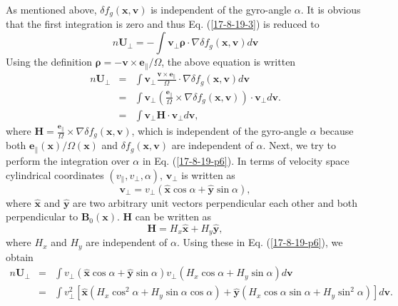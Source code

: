 \documentclass{article}
\newcommand{\tmmathbf}[1]{\ensuremath{\boldsymbol{#1}}}
\begin{document}
As mentioned above, $\delta f_g (\mathbf{x}, \mathbf{v})$ is independent of
the gyro-angle $\alpha$. It is obvious that the first integration is zero and
thus Eq. (\ref{17-8-19-3}) is reduced to
\begin{equation}
  n\mathbf{U}_{\perp} = - \int \mathbf{v}_{\perp} \tmmathbf{\rho} \cdot \nabla
  \delta f_g (\mathbf{x}, \mathbf{v}) d\mathbf{v}
\end{equation}
Using the definition $\tmmathbf{\rho}= -\mathbf{v} \times
\mathbf{e}_{\parallel} / \Omega$, the above equation is written
\begin{eqnarray}
  n\mathbf{U}_{\perp} & = & \int \mathbf{v}_{\perp} \frac{\mathbf{v} \times
  \mathbf{e}_{\parallel}}{\Omega} \cdot \nabla \delta f_g (\mathbf{x},
  \mathbf{v}) d\mathbf{v} \nonumber\\
  & = & \int \mathbf{v}_{\perp} \left( \frac{\mathbf{e}_{\parallel}}{\Omega}
  \times \nabla \delta f_g (\mathbf{x}, \mathbf{v}) \right) \cdot
  \mathbf{v}_{\perp} d\mathbf{v}. \nonumber\\
  & = & \int \mathbf{v}_{\perp} \mathbf{H} \cdot \mathbf{v}_{\perp}
  d\mathbf{v},  \label{17-8-19-p6}
\end{eqnarray}
where $\mathbf{H}= \frac{\mathbf{e}_{\parallel}}{\Omega} \times \nabla \delta
f_g (\mathbf{x}, \mathbf{v})$, which is independent of the gyro-angle $\alpha$
because both $\mathbf{e}_{\parallel} (\mathbf{x}) / \Omega (\mathbf{x})$ and
$\delta f_g (\mathbf{x}, \mathbf{v})$ are independent of $\alpha$. Next, we
try to perform the integration over $\alpha$ in Eq. (\ref{17-8-19-p6}). In
terms of velocity space cylindrical coordinates $(v_{\parallel}, v_{\perp},
\alpha)$, $\mathbf{v}_{\perp}$ is written as
\begin{equation}
  \mathbf{v}_{\perp} = v_{\perp} (\hat{\mathbf{x}} \cos \alpha +
  \hat{\mathbf{y}} \sin \alpha),
\end{equation}
where $\hat{\mathbf{x}}$ and $\hat{\mathbf{y}}$ are two arbitrary unit vectors
perpendicular each other and both perpendicular to $\mathbf{B}_0
(\mathbf{x})$. $\mathbf{H}$ can be written as
\begin{equation}
  \mathbf{H}= H_x \hat{\mathbf{x}} + H_y \hat{\mathbf{y}},
\end{equation}
where $H_x$ and $H_y$ are independent of $\alpha$. Using these in Eq.
(\ref{17-8-19-p6}), we obtain
\begin{eqnarray}
  n\mathbf{U}_{\perp} & = & \int v_{\perp} (\hat{\mathbf{x}} \cos \alpha +
  \hat{\mathbf{y}} \sin \alpha) v_{\perp} (H_x \cos \alpha + H_y \sin \alpha)
  d\mathbf{v} \nonumber\\
  & = & \int v_{\perp}^2 [\hat{\mathbf{x}} (H_x \cos^2 \alpha + H_y \sin
  \alpha \cos \alpha) + \hat{\mathbf{y}} (H_x \cos \alpha \sin \alpha + H_y
  \sin^2 \alpha)] d\mathbf{v}. 
\end{eqnarray}
\end{document}
